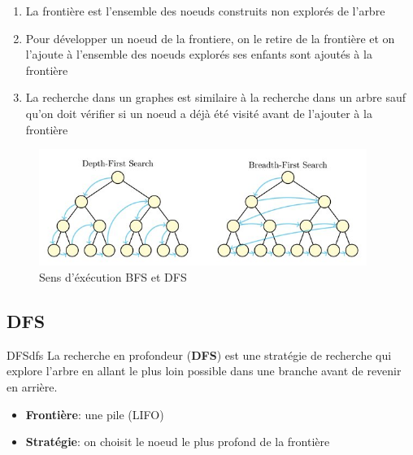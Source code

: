\documentclass[a4paper, 12pt]{extarticle}
\begin{document}
\begin{remarks}\leavevmode
\begin{enumerate}
    \item La frontière est l'ensemble des noeuds construits non explorés de l'arbre
    \item Pour développer un noeud de la frontiere, on le retire de la frontière et on l'ajoute à l'ensemble des noeuds explorés
        ses enfants sont ajoutés à la frontière
    \item La recherche dans un graphes est similaire à la recherche dans un arbre sauf qu'on doit vérifier si un noeud a déjà été visité
        avant de l'ajouter à la frontière
\end{enumerate}
\end{remarks}



\begin{figure}[H]
    \begin{center}
        \includegraphics[width=0.95\textwidth]{./pictures/bfsschema.jpg}
    \end{center}
    \caption{Sens d'éxécution BFS et DFS}\label{fig:bfsschema}
\end{figure}



\subsection{DFS} %
\label{sub:dfs}

\begin{definition}{DFS}{dfs}
    La recherche en profondeur (\textbf{DFS}) est une stratégie de recherche qui explore l'arbre en allant le plus loin possible dans une branche avant de revenir en arrière. 
    \begin{itemize}
        \item \textbf{Frontière}: une pile (LIFO)
        \item \textbf{Stratégie}: on choisit le noeud le plus profond de la frontière
    \end{itemize} 
\end{definition}
\end{document}
